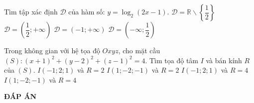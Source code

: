 \begin{ex}%
Tìm tập xác định $\mathscr{D}$ của hàm số: $y=\log_2(2x-1)$.
\choice
{$\mathscr{D}=\mathbb{R}\backslash \left\{ \dfrac{1}{2} \right\}$}  
{\True $\mathscr{D}=\left( \dfrac{1}{2};+\infty  \right)$}  
{$\mathscr{D}=(-1;+\infty )$}  
{$\mathscr{D}=\left( -\infty ;\dfrac{1}{2} \right)$}
\end{ex}

\begin{ex}%
Trong không gian với hệ tọa độ $Oxyz$, cho mặt cầu $(S): (x+1)^2+(y-2)^2+(z-1)^2=4$. Tìm tọa độ tâm $I$ và bán kính $R$ của $(S)$.
\choice
{\True $I\left( -1;2;1 \right)$ và $R=2$}  
{$I\left( 1;-2;-1 \right)$ và $R=2$}  
{$I\left( -1;2;1 \right)$ và $R=4$}  
{$I\left( 1;-2;-1 \right)$ và $R=4$}
\end{ex}


\newpage
\begin{center}
	\textbf{ĐÁP ÁN}
\end{center}
\begin{multicols}{10}
	 
\end{multicols}



